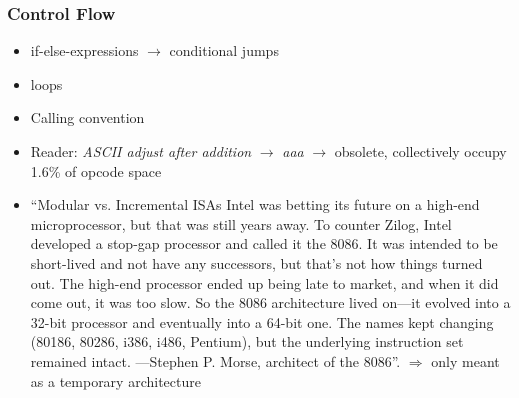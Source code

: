 \subsubsection{Control Flow}

\begin{itemize}
	\item if-else-expressions $\rightarrow$ conditional jumps
	\item loops
\end{itemize}

\begin{itemize}
	\item Calling convention
	\item \riscv{} Reader: \emph{ASCII adjust after addition} $\rightarrow$ \emph{aaa} $\rightarrow$ obsolete, collectively occupy 1.6\% of opcode space\cite[p.~4]{Patterson2017}
	\item
	      \enquote{Modular vs. Incremental ISAs Intel was betting its future on a high-end microprocessor, but that was still years away.
		      To counter Zilog, Intel developed a stop-gap processor and called it the 8086. It was intended to be short-lived and not have any successors,
		      but that’s not how things turned out. The high-end processor ended up being late to market, and when it did come out, it was too slow.
		      So the 8086 architecture lived on—it evolved into a 32-bit processor and eventually into a 64-bit one.
		      The names kept changing (80186, 80286, i386, i486, Pentium), but the underlying instruction set remained intact. —Stephen P. Morse, architect of the 8086}\cite{Morse2017}.
	      $\Rightarrow$ only meant as a temporary architecture
\end{itemize}
